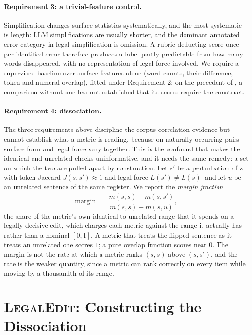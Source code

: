 \documentclass[11pt]{article}
\begin{document}
\paragraph{Requirement 3: a trivial-feature control.}
Simplification changes surface statistics systematically, and the most
systematic is length: LLM simplifications are usually shorter, and the dominant
annotated error category in legal simplification is omission. A rubric deducting
score once per identified error therefore produces a label partly predictable
from how many words disappeared, with no representation of legal force involved.
We require a supervised baseline over surface features alone (word counts, their
difference, token and numeral overlap), fitted under Requirement 2: on the
precedent of \citet{pacchiardi2024cleverhans}, a comparison without one has not
established that its scores require the construct.

\paragraph{Requirement 4: dissociation.}
The three requirements above discipline the corpus-correlation evidence but
cannot establish what a metric is reading, because on naturally occurring pairs
surface form and legal force vary together. This is the confound that makes the
identical and unrelated checks uninformative, and it needs the same remedy: a
set on which the two are pulled apart by construction. Let $s'$ be a
perturbation of $s$ with token Jaccard $J(s,s') \approx 1$ and legal force
$L(s') \neq L(s)$, and let $u$ be an unrelated sentence of the same register. We
report the \emph{margin fraction}
\[
\text{margin} \;=\; \frac{\overline{m(s,s)} - \overline{m(s,s')}}
                          {\overline{m(s,s)} - \overline{m(s,u)}},
\]
the share of the metric's own identical-to-unrelated range that it spends on a
legally decisive edit, which charges each metric against the range it actually
has rather than a nominal $[0,1]$. A metric that treats the flipped sentence as
it treats an unrelated one scores $1$; a pure overlap function scores near $0$.
The margin is not the rate at which a metric ranks $(s,s)$ above $(s,s')$, and
the rate is the weaker quantity, since a metric can rank correctly on every item
while moving by a thousandth of its range.

\section{\textsc{LegalEdit}: Constructing the Dissociation}
\label{sec:legaledit}
\end{document}
